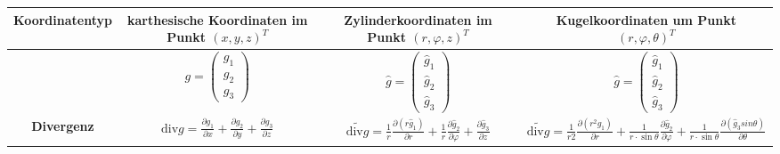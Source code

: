 \documentclass[6pt,a4paper]{scrartcl}
\begin{document}
\begin{center}
\begin{tabular}{|c|c|c|c|}
        \hline
        \textbf{Koordinatentyp}   & karthesische Koordinaten im Punkt $(x,y,z)^T$                                                                 & Zylinderkoordinaten im Punkt $(r,\varphi,z)^T$                                                                                                                                                                      & Kugelkoordinaten um Punkt $(r,\varphi,\theta)^T$                                                                                                                                                                                                                                                                       \\
        \hline
                                  & $g=\begin{pmatrix} g_1 \\ g_2 \\ g_3 \end{pmatrix}$                                                                                & $\hat{g}=\begin{pmatrix} \hat{g}_1 \\ \hat{g}_2 \\ \hat{g}_3 \end{pmatrix}$                                                                                                                                                                                & $\hat{g}=\begin{pmatrix} \hat{g}_1 \\ \hat{g}_2 \\ \hat{g}_3 \end{pmatrix}$                                                                                                                                                                                                                                                                                   \\
        \hline
        \textbf{Divergenz}        & $\text{div}g=\frac{\partial g_1}{\partial x}+\frac{\partial g_2}{\partial y}+\frac{\partial g_3}{\partial z}$ & $\widetilde{\text{div}g}=\frac{1}{r}\frac{\partial(r\hat{g}_1)}{\partial r}+\frac{1}{r}\frac{\partial\hat{g}_2}{\partial\varphi}+\frac{\partial\hat{g}_3}{\partial z}$                                              & $\widetilde{\text{div}g}=\frac{1}{r2}\frac{\partial(r^2\hat{g}_1)}{\partial r}+\frac{1}{r\cdot\sin\theta}\frac{\partial\hat{g}_2}{\partial\varphi}+\frac{1}{r\cdot\sin\theta}\frac{\partial(\hat{g}_3sin\theta)}{\partial\theta}$                                                                                      \\

\end{tabular}
\end{center}
\end{document}
